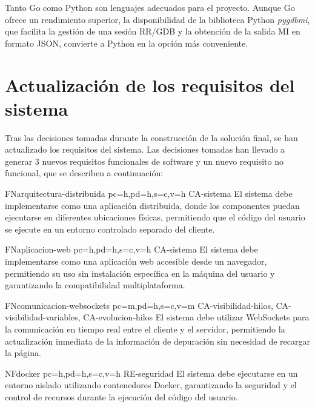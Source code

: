 Tanto Go como Python son lenguajes adecuados para el proyecto. Aunque Go ofrece un rendimiento superior, la disponibilidad de la biblioteca Python \textit{pygdbmi}, que facilita la gestión de una sesión RR/GDB y la obtención de la salida MI en formato JSON, convierte a Python en la opción más conveniente.

\section{Actualización de los requisitos del sistema} \label{sec:actualizacion-requisitos}
Tras las decisiones tomadas durante la construcción de la solución final, se han actualizado los requisitos del sistema. Las decisiones tomadas han llevado a generar 3 nuevos requisitos funcionales de software y un nuevo requisito no funcional, que se describen a continuación:

\begin{softwareReq}{FN}{arquitectura-distribuida}
    {pc=h,pd=h,s=c,v=h}
    {CA-sistema}
    El sistema debe implementarse como una aplicación distribuida, donde los componentes puedan ejecutarse en diferentes ubicaciones físicas, permitiendo que el código del usuario se ejecute en un entorno controlado separado del cliente.
\end{softwareReq}

\begin{softwareReq}{FN}{aplicacion-web}
    {pc=h,pd=h,s=c,v=h}
    {CA-sistema}
    El sistema debe implementarse como una aplicación web accesible desde un navegador, permitiendo su uso sin instalación específica en la máquina del usuario y garantizando la compatibilidad multiplataforma.
\end{softwareReq}

\begin{softwareReq}{FN}{comunicacion-websockets}
    {pc=m,pd=h,s=c,v=m}
    {CA-visibilidad-hilos, CA-visibilidad-variables, CA-evolucion-hilos}
    El sistema debe utilizar WebSockets para la comunicación en tiempo real entre el cliente y el servidor, permitiendo la actualización inmediata de la información de depuración sin necesidad de recargar la página.
\end{softwareReq}

\begin{softwareReq}{NF}{docker}
    {pc=h,pd=h,s=c,v=h}
    {RE-seguridad}
    El sistema debe ejecutarse en un entorno aislado utilizando contenedores Docker, garantizando la seguridad y el control de recursos durante la ejecución del código del usuario.
\end{softwareReq}

